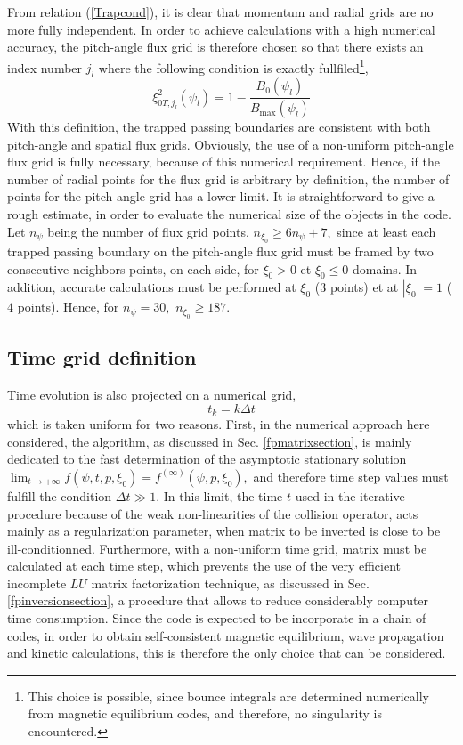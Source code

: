 From relation (\ref{Trapcond}), it is clear that momentum and radial grids
are no more fully independent. In order to achieve calculations with a high
numerical accuracy, the pitch-angle flux grid is therefore chosen so that
there exists an index number $j_{l}$ where the following condition is
exactly fullfiled\footnote{%
This choice is possible, since bounce integrals are determined numerically
from magnetic equilibrium codes, and therefore, no singularity is
encountered.},
\begin{equation}
\xi _{0T,j_{l}}^{2}\left( \psi _{l}\right) =1-\frac{B_{0}\left( \psi
_{l}\right) }{B_{\max }\left( \psi _{l}\right) }
\end{equation}
With this definition, the trapped passing boundaries are consistent with
both pitch-angle and spatial flux grids. Obviously, the use of a non-uniform
pitch-angle flux grid is fully necessary, because of this numerical
requirement. Hence, if the number of radial points for the flux grid is
arbitrary by definition, the number of points for the pitch-angle grid has a
lower limit. It is straightforward to give a rough estimate, in order to
evaluate the numerical size of the objects in the code. Let $n_{\psi }$
being the number of flux grid points, $n_{\xi _{0}}\geq 6n_{\psi }+7,$ since
at least each trapped passing boundary on the pitch-angle flux grid must be
framed by two consecutive neighbors points, on each side, for $\xi _{0}>0$
et $\xi _{0}\leq 0$ domains. In addition, accurate calculations must be
performed at $\xi _{0}$ ($3$ points) et at $\left| \xi _{0}\right| =1$ ($4$
points). Hence, for $n_{\psi }=30,$ $n_{\xi _{0}}\geq 187.$

\subsection{Time grid definition}

Time evolution is also projected on a numerical grid,
\begin{equation}
t_{k}=k\Delta t
\end{equation}
which is taken uniform for two reasons. First, in the numerical approach
here considered, the algorithm, as discussed in Sec. \ref{fpmatrixsection}, is
mainly dedicated to the fast determination of the asymptotic stationary
solution $\lim_{t\rightarrow +\infty }f\left( \psi ,t,p,\xi _{0}\right)
=f^{\left( \infty \right) }\left( \psi ,p,\xi _{0}\right) ,$ and therefore
time step values must fulfill the condition $\Delta t\gg 1.$ In this limit,
the time $t$ used in the iterative procedure because of the weak
non-linearities of the collision operator, acts mainly as a regularization
parameter, when matrix to be inverted is close to be ill-conditionned.
Furthermore, with a non-uniform time grid, matrix must be calculated at each
time step, which prevents the use of the very efficient incomplete $LU$
matrix factorization technique, as discussed in Sec. \ref{fpinversionsection}, a
procedure that allows to reduce considerably computer time consumption.
Since the code is expected to be incorporate in a chain of codes, in order
to obtain self-consistent magnetic equilibrium, wave propagation and kinetic
calculations, this is therefore the only choice that can be considered.
